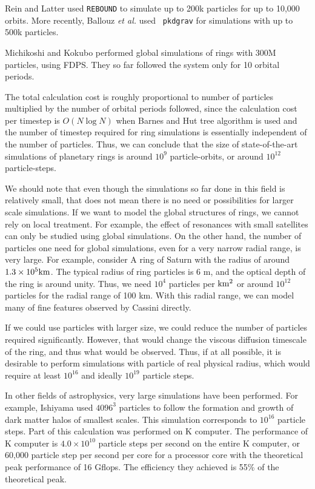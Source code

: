\documentclass[sigconf]{acmart}
\begin{document}
Rein and Latter \cite{ReinLatter2013}  used {\tt REBOUND} to simulate
up to 200k particles for up to 10,000 orbits. More recently,
Ballouz {\it et al.}\cite{Ballouzetal2017} used {\tt
  pkdgrav}\cite{Stadel2001}  for simulations with up to 500k
particles.

Michikoshi and Kokubo \cite{MichikoshiKokubo2017} performed global
simulations of rings with 300M particles, using
FDPS\cite{Iwasawaetal2016}. They so far followed the system only for
10 orbital periods.

The total calculation cost is roughly proportional to number of
particles multiplied by the number of orbital periods followed, since
the calculation cost per timestep is $O(N \log N)$ when Barnes and Hut
tree algorithm is used and the number of timestep required for ring
simulations is essentially independent of the number of
particles. Thus, we can conclude that the size of state-of-the-art
simulations of planetary rings is around $10^9$ particle-orbits, or
around $10^{12}$ particle-steps.

We should note that even though the simulations so far done in this
field is relatively small, that does not mean there is no need or
possibilities for larger scale simulations. If we want to model the
global structures of rings, we cannot rely on local treatment. For
example, the effect of resonances with small satellites can only be
studied using global simulations. On the other hand, the number of
particles one need for global simulations, even  for a very narrow
radial range, is very large. For example, consider A ring of Saturn
with the radius of around $1.3\times 10^5\rm km$. The typical radius
of ring particles is 6 m\cite{ZEBKER1985531}, and the optical depth of
the ring is around unity. Thus, we need $10^4$ particles per $\rm
km^2$ or around $10^{12}$ particles for the radial range of 100
km. With this radial range, we can model many of fine features observed
by Cassini directly.

If we could use particles with larger size, we could reduce the number
of particles required significantly. However, that would change the
viscous diffusion timescale of the ring, and thus  what would be observed. Thus, if at all possible, it is
desirable to perform simulations with particle of real physical
radius, which  would require at least $10^{16}$ and ideally $10^{19}$ particle
steps.

In other fields of astrophysics, very large simulations have been
performed. For example, Ishiyama\cite{Ishiyama2014} used $4096^3$
particles to follow the formation and growth of dark matter halos of
smallest scales. This simulation corresponds to  $10^{16}$ particle
steps. Part of this calculation was performed on K computer. The
performance of K computer is $4.0\times 10^{10}$ particle steps per
second on the entire K computer, or 60,000 particle step per second
per core for a processor core with the theoretical peak performance of
16 Gflops\cite{Ishiyamaetal2012}. The efficiency they achieved is 55\%
of the theoretical peak. 
\end{document}
